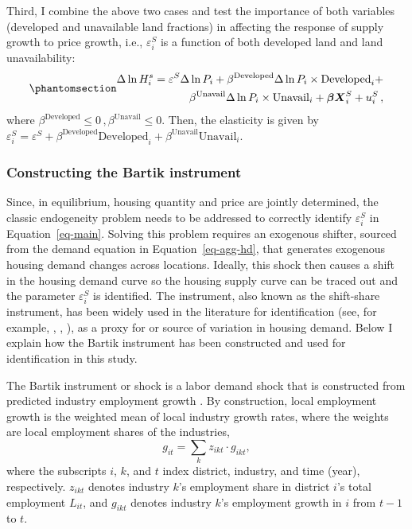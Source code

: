 \documentclass[
  12pt,
]{article}
\begin{document}
Third, I combine the above two cases and test the importance of both
variables (developed and unavailable land fractions) in affecting the
response of supply growth to price growth, i.e., \(\varepsilon^S_i\) is
a function of both developed land and land unavailability:
\begin{equation}\protect\phantomsection\label{eq-case-4}{
\begin{aligned}
\Delta\ln H_i^s = \varepsilon^S\Delta\ln P_i + \beta^{\text{Developed}} \Delta \ln P_i\times\text{Developed}_i + \\
\beta^{\text{Unavail}} \Delta \ln P_i\times\text{Unavail}_i + \boldsymbol{\beta}\boldsymbol{X}_i^S + u^S_i\,,
\end{aligned} 
}\end{equation} where
\(\beta^{\text{Developed}} \le 0\,, \beta^{\text{Unavail}}\le0\). Then,
the elasticity is given by
\(\varepsilon^S_i = \varepsilon^S + \beta^{\text{Developed}}\text{Developed}_i + \beta^{\text{Unavail}}\text{Unavail}_i\).

\subsubsection{Constructing the Bartik
instrument}\label{constructing-the-bartik-instrument}

Since, in equilibrium, housing quantity and price are jointly
determined, the classic endogeneity problem needs to be addressed to
correctly identify \(\varepsilon^S_i\) in Equation~\ref{eq-main}.
Solving this problem requires an exogenous shifter, sourced from the
demand equation in Equation~\ref{eq-agg-hd}, that generates exogenous
housing demand changes across locations. Ideally, this shock then causes
a shift in the housing demand curve so the housing supply curve can be
traced out and the parameter \(\varepsilon^S_i\) is identified. The
\citet{bartik_1991} instrument, also known as the shift-share
instrument, has been widely used in the literature for identification
(see, for example, \citet{saiz_2010}, \citet{hilber_vermeulen_2016},
\citet{baum-snow_han_2019}), as a proxy for or source of variation in
housing demand. Below I explain how the Bartik instrument has been
constructed and used for identification in this study.

The Bartik instrument or shock is a labor demand shock that is
constructed from predicted industry employment growth
\citep{goldsmith-pinkham_etal_2020, blanchard_katz_1992, bartik_1991}.
By construction, local employment growth is the weighted mean of local
industry growth rates, where the weights are local employment shares of
the industries, \[
g_{it} = \sum_k z_{ikt}\cdot g_{ikt},
\] where the subscripts \(i\), \(k\), and \(t\) index district,
industry, and time (year), respectively. \(z_{ikt}\) denotes industry
\(k\)'s employment share in district \(i\)'s total employment
\(L_{it}\), and \(g_{ikt}\) denotes industry \(k\)'s employment growth
in \(i\) from \(t-1\) to \(t\).
\end{document}
